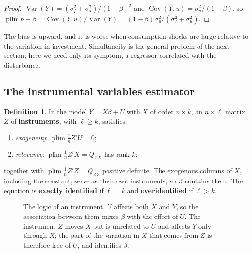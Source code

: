 \documentclass[11pt,a4paper]{article}
\numberwithin{equation}{section}
\DeclareMathOperator{\Var}{Var}
\DeclareMathOperator{\Cov}{Cov}
\DeclareMathOperator{\plim}{plim}
\theoremstyle{definition}
\newtheorem{defn}[thm]{Definition}
\begin{document}
\begin{proof}
$\Var(Y) = (\sigma_I^2 + \sigma_u^2)/(1 - \beta)^2$ and $\Cov(Y, u) = \sigma_u^2/(1 - \beta)$, so $\plim b - \beta = \Cov(Y, u)/\Var(Y) = (1 - \beta)\sigma_u^2/(\sigma_I^2 + \sigma_u^2)$.
\end{proof}

The bias is upward, and it is worse when consumption shocks are large relative to the variation in investment. Simultaneity is the general
problem of the next section; here we need only its symptom, a regressor correlated with the disturbance.

\subsection{The instrumental variables estimator}
\label{ssec:ivest}

\begin{defn}
In the model $Y = X\beta + U$ with $X$ of order $n \times k$, an $n \times \ell$ matrix $Z$ of \textbf{instruments}, with $\ell \geq k$, satisfies
\begin{enumerate}[label=(\roman*)]
\item \emph{exogeneity}: $\plim\frac1nZ'U = 0$;
\item \emph{relevance}: $\plim\frac1nZ'X = Q_{ZX}$ has rank $k$;
\end{enumerate}
together with $\plim\frac1nZ'Z = Q_{ZZ}$ positive definite. The exogenous columns of $X$, including the constant, serve as their own instruments, so $Z$
contains them. The equation is \textbf{exactly identified} if $\ell = k$ and \textbf{overidentified} if $\ell > k$.
\end{defn}

\begin{figure}[H]
\centering
{}
\caption{The logic of an instrument. $U$ affects both $X$ and $Y$, so the association between them mixes $\beta$ with the effect of $U$. The instrument $Z$
moves $X$ but is unrelated to $U$ and affects $Y$ only through $X$; the part of the variation in $X$ that comes from $Z$ is therefore free of $U$, and
identifies $\beta$.}
\label{fig:ivlogic}
\end{figure}
\end{document}
